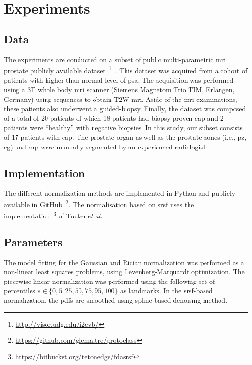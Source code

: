 \section{Experiments}
\label{sec:exp}

\subsection{Data}

The experiments are conducted on a subset of public multi-parametric \ac{mri} prostate publicly available dataset~\footnote{\url{http://visor.udg.edu/i2cvb/}}~\cite{lemaitre2015boosting}.
This dataset was acquired from a cohort of patients with higher-than-normal level of \ac{psa}. 
The acquisition was performed using a 3T whole body \ac{mri} scanner (Siemens Magnetom Trio TIM, Erlangen, Germany) using sequences to obtain T2W-\ac{mri}. 
Aside of the \ac{mri} examinations, these patients also underwent a guided-biopsy. 
Finally, the dataset was composed of a total of 20 patients of which 18 patients had biopsy proven \ac{cap} and 2 patients were ``healthy'' with negative biopsies. 
In this study, our subset consists of 17 patients with \ac{cap}. 
The prostate organ as well as the prostate zones (i.e., \ac{pz}, \ac{cg}) and \ac{cap} were manually segmented by an experienced radiologist.

\subsection{Implementation}

The different normalization methods are implemented in Python and publicly available in GitHub~\footnote{\url{https://github.com/glemaitre/protoclass}}.
The normalization based on \ac{srsf} uses the implementation~\footnote{\url{https://bitbucket.org/tetonedge/fdasrsf}} of Tucker\,\textit{et al.}~\cite{Tucker2013}.

\subsection{Parameters}

The model fitting for the Gaussian and Rician normalization was performed as a non-linear least squares problems, using Levenberg-Marquardt optimization.
The piecewise-linear normalization was performed using the following set of percentiles $s \in \{0, 5, 25, 50, 75, 95, 100 \}$ as landmarks.
In the \ac{srsf}-based normalization, the \acp{pdf} are smoothed using spline-based denoising method.
